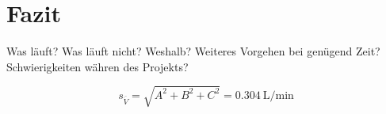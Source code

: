 \chapter{Fazit}
\label{chap:fazit}

Was  l\"auft? Was  l\"auft  nicht? Weshalb? Weiteres Vorgehen  bei  gen\"ugend
Zeit? Schwierigkeiten w\"ahren des Projekts?

\lipsum[1]
\begin{equation}
    \label{eq:errorTurbulent:simple}
    s_{\overline{\dot{V}}} = \sqrt{ A^2 + B^2 + C^2 } = \SI{0.304}{\liter\per\minute}
\end{equation}

\lipsum[2]

